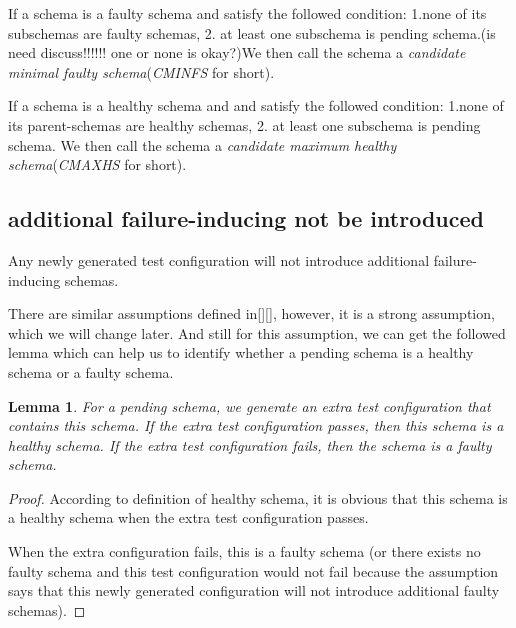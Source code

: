 \documentclass[10pt,journal,cspaper,compsoc]{IEEEtran}
\begin{document}
\begin{definition}
If a schema is a faulty schema and satisfy the followed condition:
1.none of its subschemas are faulty schemas, 2. at least one subschema is pending schema.(is need discuss!!!!!! one or none is okay?)We then call the schema a \emph{candidate minimal faulty schema}(\emph{CMINFS} for short).
\end{definition}
\begin{definition}
If a schema is a healthy schema and and satisfy the followed condition:
1.none of its  parent-schemas are healthy schemas, 2. at least one subschema is pending schema. We then call the schema a \emph{candidate maximum healthy schema}(\emph{CMAXHS} for short).
\end{definition}



\subsection{additional failure-inducing not be introduced}
\begin{assumption}
Any newly generated test configuration will not introduce additional failure-inducing schemas.
\end{assumption}

There are similar assumptions defined in[][], however, it is a strong assumption, which we will change later. And still for this assumption, we can get the followed lemma which can help us to identify whether a pending schema is a healthy schema or a faulty schema.
\newtheorem{lemma}{Lemma}
\begin{lemma}
For a pending schema, we generate an extra test configuration that contains this schema. If the extra test configuration passes, then this schema is a healthy schema. If the extra test configuration fails, then the schema is a faulty schema.
\end{lemma}
\begin{proof}
According to definition of healthy schema, it is obvious that this schema is a healthy schema when the extra test configuration passes.

When the extra configuration fails, this is a faulty schema (or there exists no faulty schema and this test configuration would not fail because the assumption says that this newly generated configuration will not introduce additional faulty schemas).
\end{proof}
\end{document}
